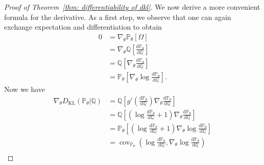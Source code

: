 \documentclass[reqno]{amsart}
\newcommand{\1}{\mathds{1}}
\renewcommand{\d}{\mathrm{d}}
\newcommand{\grad}{\nabla}
\renewcommand{\P}{\mathds{P}}
\newcommand{\Q}{\mathds{Q}}
\DeclareMathOperator{\cov}{cov}
\newcommand{\dkl}{D_{\mathrm{KL}}}
\theoremstyle{definition}
\theoremstyle{remark}
\begin{document}
\begin{proof}[Proof of Theorem~\ref{thm: differentiability of dkl}]
  We now derive a more convenient formula for the derivative.
  As a first step, we observe that one can again exchange expectation and differentiation to obtain
  \begin{align}
    0 &= \grad_\theta \P_\theta [\Omega] \nonumber \\
      &=\grad_\theta \Q \left [\frac{\d \P_\theta}{\d \Q} \right ] \nonumber\\
      &= \Q \left [ \grad_\theta \frac{\d \P_\theta}{\d \Q} \right ] \nonumber\\
      &= \P_\theta \left [  \grad_\theta \log \frac{\d \P_\theta}{\d \Q} \right ]. \label{eq: expectation of score is zero} 
  \end{align}
  Now we have 
  \begin{align*}
    \grad_\theta \dkl ( \P_\theta \vert \Q) &= \Q \left [ g' \left ( \frac{\d \P_\theta}{\d \Q} \right ) \grad_\theta  \frac{\d \P_\theta}{\d \Q} \right ] \\
                                            &= \Q \left [ \left ( \log \frac{\d \P_\theta}{\d \Q} + 1 \right ) \grad_\theta \frac{\d \P_\theta}{\d \Q}\right ] \\
                                            &= \P_\theta \left [\left ( \log \frac{\d \P_\theta}{\d \Q}+1 \right )   \grad_\theta \log \frac{\d \P_\theta}{\d \Q} \right ] \\   
                                            &= \cov_{\P_\theta} \left (    \log \frac{\d \P_\theta}{\d \Q},   \grad_\theta \log \frac{\d \P_\theta}{\d \Q} \right )\\

\end{align*}
\end{proof}
\end{document}

